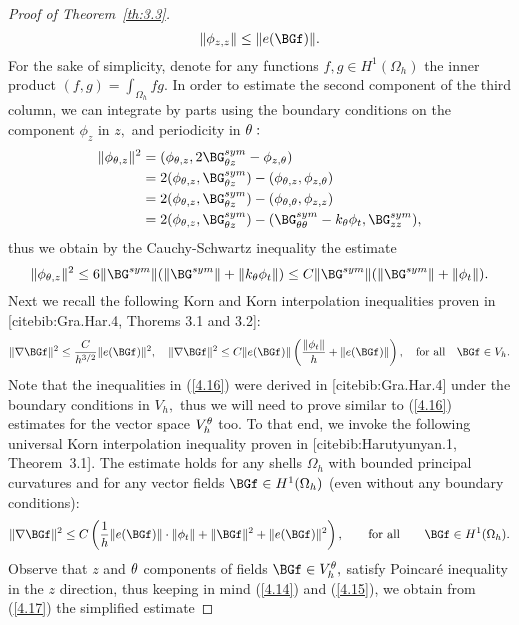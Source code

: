 \begin{proof}[Proof of Theorem~{\ref{th:3.3}}]
\begin{equation}
\label{4.14}
\|\phi_{z,z}\|\leq \|e(\BGf)\|.
\end{equation}
For the sake of simplicity, denote for any functions $f,g\in H^1(\Omega_h)$ the inner product $(f,g)=\int_{\Omega_h}fg.$ In order to estimate the 
second component of the third column, we can integrate by parts using the boundary conditions on the component $\phi_z$ in $z,$ and periodicity in $\theta:$
\begin{align*}
\|\phi_{\Gth,z}\|^2&=(\phi_{\Gth,z},2\BG^{sym}_{\Gth z}-\phi_{z,\Gth})\\ 
&=2(\phi_{\Gth,z},\BG^{sym}_{\Gth z})-(\phi_{\Gth,z},\phi_{z,\Gth})\\
&=2(\phi_{\Gth,z},\BG^{sym}_{\Gth z})-(\phi_{\Gth,\Gth},\phi_{z,z})\\
&=2(\phi_{\Gth,z},\BG^{sym}_{\Gth z})-(\BG^{sym}_{\Gth\Gth}-k_\Gth \phi_{t},\BG^{sym}_{zz}),
\end{align*}
thus we obtain by the Cauchy-Schwartz inequality the estimate 
\begin{equation}
\label{4.15}
\|\phi_{\Gth,z}\|^2\leq 6\|\BG^{sym}\|(\|\BG^{sym}\|+\|k_\Gth\phi_t\|)\leq C\|\BG^{sym}\|(\|\BG^{sym}\|+\|\phi_t\|).
\end{equation}
Next we recall the following Korn and Korn interpolation inequalities proven in [cite{bib:Gra.Har.4}, Thorems 3.1 and 3.2]:
\begin{equation}
\label{4.16}
\|\nabla \BGf\|^{2} \leq \frac{C}{h^{3/2}}\|e(\BGf)\|^2,\quad \|\nabla \BGf\|^{2} \leq C\|e(\BGf)\|\left(\frac{\left\|\phi_{t}\right\|}{h}+\|e(\BGf)\|\right),
\quad\text{for all}\quad \BGf\in V_h.
\end{equation}
Note that the inequalities in (\ref{4.16}) were derived in [cite{bib:Gra.Har.4}] under the boundary conditions in $V_h,$ thus we will need to prove similar to (\ref{4.16}) estimates for the vector space $V_h^\theta$ too. To that end, we invoke the following universal Korn interpolation inequality proven in [cite{bib:Harutyunyan.1}, Theorem~3.1]. The estimate holds for any shells $\Omega_h$ with bounded principal curvatures and for any vector fields $\BGf\in H^1(\Omega_h)$ (even without any boundary conditions):
\begin{equation}
\label{4.17}
\|\nabla\BGf\|^2\leq C\left(\frac{1}{h}\|e(\BGf)\|\cdot\|\phi_t\|+\|\BGf\|^2+\|e(\BGf)\|^2\right),\qquad\text{for all}\qquad \BGf\in H^1(\Omega_h).
\end{equation} 
Observe that $z$ and $\theta$ components of fields $\BGf\in V_h^\Gth,$ satisfy Poincar\'e inequality in the $z$ direction, thus keeping in mind (\ref{4.14}) and (\ref{4.15}), we obtain from (\ref{4.17}) the simplified estimate 

\end{proof}
